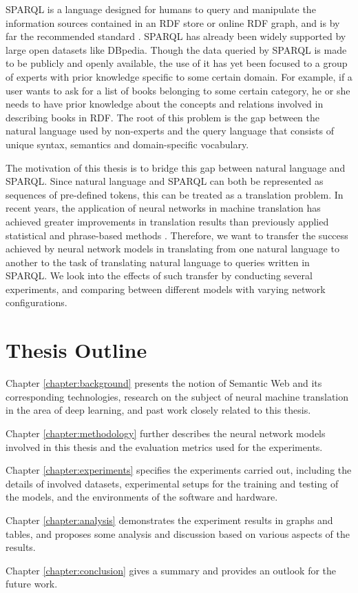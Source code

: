 SPARQL is a language designed for humans to query and manipulate the information sources contained in an RDF store or online RDF graph, and is by far the recommended standard \cite{Harris2013}. SPARQL has already been widely supported by large open datasets like DBpedia. Though the data queried by SPARQL is made to be publicly and openly available, the use of it has yet been focused to a group of experts with prior knowledge specific to some certain domain. For example, if a user wants to ask for a list of books belonging to some certain category, he or she needs to have prior knowledge about the concepts and relations involved in describing books in RDF. The root of this problem is the gap between the natural language used by non-experts and the query language that consists of unique syntax, semantics and domain-specific vocabulary. 

The motivation of this thesis is to bridge this gap between natural language and SPARQL. Since natural language and SPARQL can both be represented as sequences of pre-defined tokens, this can be treated as a translation problem. In recent years, the application of neural networks in machine translation has achieved greater improvements in translation results than previously applied statistical and phrase-based methods \cite{Moussallem2017}. Therefore, we want to transfer the success achieved by neural network models in translating from one natural language to another to the task of translating natural language to queries written in SPARQL. We look into the effects of such transfer by conducting several experiments, and comparing between different models with varying network configurations. 

\section{Thesis Outline} \label{section:thesis outline}

Chapter \ref{chapter:background} presents the notion of Semantic Web and its corresponding technologies, research on the subject of neural machine translation in the area of deep learning, and past work closely related to this thesis. 

Chapter \ref{chapter:methodology} further describes the neural network models involved in this thesis and the evaluation metrics used for the experiments.

Chapter \ref{chapter:experiments} specifies the experiments carried out, including the details of involved datasets, experimental setups for the training and testing of the models, and the environments of the software and hardware.

Chapter \ref{chapter:analysis} demonstrates the experiment results in graphs and tables, and proposes some analysis and discussion based on various aspects of the results.

Chapter \ref{chapter:conclusion} gives a summary and provides an outlook for the future work.